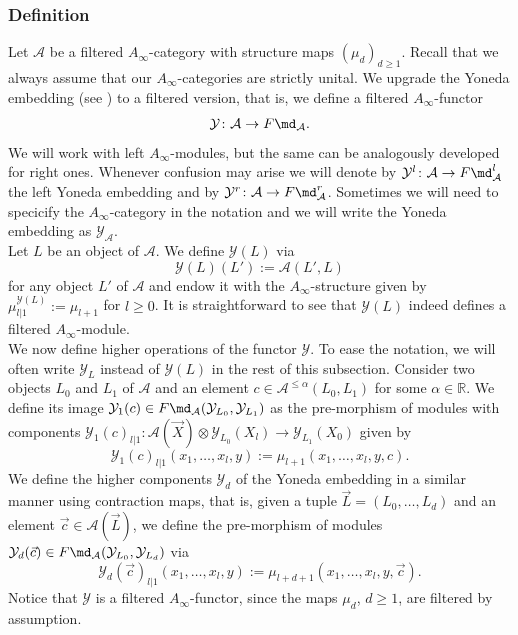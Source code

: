 \subsubsection{Definition}\label{gio:fyon-def}
Let $\mathcal{A}$ be a filtered $A_\infty$-category with structure maps $(\mu_d)_{d\geq 1}$. Recall that we always assume that our $A_\infty$-categories are strictly unital. We upgrade the Yoneda embedding (see \cite[Section (1l)]{Se:book-fukaya-categ}) to a filtered version, that is, we define a filtered $A_\infty$-functor $$\mathcal{Y}\colon \mathcal{A}\to F\md_\mathcal{A}.$$ We will work with left $A_\infty$-modules, but the same can be analogously developed for right ones. Whenever confusion may arise we will denote by $\mathcal{Y}^l\colon \mathcal{A}\to F\md^l_\mathcal{A}$ the left Yoneda embedding and by $\mathcal{Y}^r\colon \mathcal{A}\to F\md_\mathcal{A}^r$. Sometimes we will need to specicify the $A_\infty$-category in the notation and we will write the Yoneda embedding as $\mathcal{Y}_\mathcal{A}$.\\

Let $L$ be an object of $\mathcal{A}$. We define $\mathcal{Y}(L)$ via $$\mathcal{Y}(L)(L'):= \mathcal{A}(L',L)$$ for any object $L'$ of $\mathcal{A}$ and endow it with the $A_\infty$-structure given by $\mu^{\mathcal{Y}(L)}_{l|1}:=\mu_{l+1}$ for $l\geq 0$. It is straightforward to see that $\mathcal{Y}(L)$ indeed defines a filtered $A_\infty$-module.\\
We now define higher operations of the functor $\mathcal{Y}$. To ease the notation, we will often write $\mathcal{Y}_L$ instead of $\mathcal{Y}(L)$ in the rest of this subsection. Consider two objects $L_0$ and $L_1$ of $\mathcal{A}$ and an element $c\in \mathcal{A}^{\leq \alpha}(L_0,L_1)$ for some $\alpha \in \mathbb{R}$. We define its image $\mathcal{Y}_1(c)\in F\md_\mathcal{A}(\mathcal{Y}_{L_0},\mathcal{Y}_{L_1})$ as the pre-morphism of modules with components $\mathcal{Y}_1(c)_{l|1}\colon \mathcal{A}(\vec{X})\otimes \mathcal{Y}_{L_0}(X_l)\to \mathcal{Y}_{L_1}(X_0)$ given by $$\mathcal{Y}_1(c)_{l|1}(x_1,\ldots, x_l,y):= \mu_{l+1}(x_1,\ldots,x_l, y,c).$$ We define the higher components $\mathcal{Y}_d$ of the Yoneda embedding in a similar manner using contraction maps, that is, given a tuple $\vec{L}=(L_0,\ldots, L_d)$ and an element $\vec{c}\in \mathcal{A}(\vec{L})$, we define the pre-morphism of modules $\mathcal{Y}_d(\vec{c})\in F\md_\mathcal{A}(\mathcal{Y}_{L_0},\mathcal{Y}_{L_d})$ via $$\mathcal{Y}_d(\vec{c})_{l|1}(x_1,\ldots, x_l,y) := \mu_{l+d+1}(x_1,\ldots, x_l,y,\vec{c}).$$ Notice that $\mathcal{Y}$ is a filtered $A_\infty$-functor, since the maps $\mu_d$, $d\geq 1$, are filtered by assumption.

